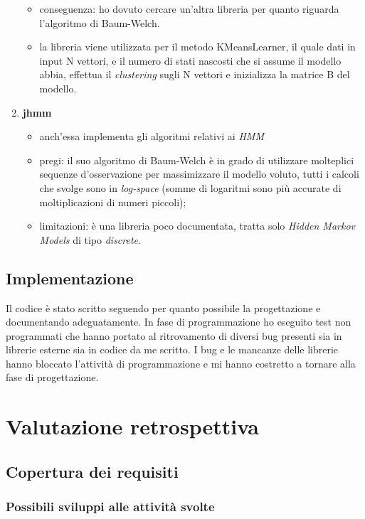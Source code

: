 \begin{enumerate}
\begin{itemize}
	\item conseguenza: ho dovuto cercare un'altra libreria per quanto riguarda l'algoritmo di Baum-Welch.
	\item la libreria viene utilizzata per il metodo KMeansLearner, il quale dati in input N vettori, e il numero di stati nascosti che si assume il modello abbia, effettua il \emph{clustering} sugli N vettori e inizializza la matrice B del modello.
	\end{itemize}
\item\textbf{jhmm}
	\begin{itemize}
	\item anch'essa implementa gli algoritmi relativi ai \emph{HMM}
	\item pregi: il suo algoritmo di Baum-Welch è in grado di utilizzare molteplici sequenze d'osservazione per massimizzare il modello voluto, tutti i calcoli che svolge sono in \emph{log-space} (somme di logaritmi sono più accurate di moltiplicazioni di numeri piccoli);
	\item limitazioni: è una libreria poco documentata, tratta solo \emph{Hidden Markov Models} di tipo \emph{discrete}.
	\end{itemize}
\end{enumerate}
\subsection{Implementazione}
\label{3.4}
\newpage
Il codice è stato scritto seguendo per quanto possibile la progettazione e documentando adeguatamente. In fase di programmazione ho eseguito test non programmati che hanno portato al ritrovamento di diversi bug presenti sia in librerie esterne sia in codice da me scritto. I bug e le mancanze delle librerie hanno bloccato l'attività di programmazione e mi hanno costretto a tornare alla fase di progettazione.
\section{Valutazione retrospettiva}
\label{4.0}

\subsection{Copertura dei requisiti}
\label{4.1}

\subsubsection{Possibili sviluppi alle attività svolte}
